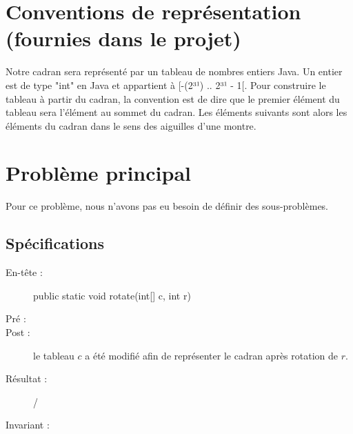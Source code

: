 	\section{Conventions de représentation (fournies dans le projet)}
	Notre cadran sera représenté par un tableau de nombres entiers Java. Un entier est de type "int" en Java et appartient à [-(2³¹) .. 2³¹ - 1[. Pour construire le tableau à partir du cadran, la convention est de dire que le premier élément du tableau sera l’élément au sommet du cadran. Les éléments suivants sont alors les éléments du cadran dans le sens des aiguilles d’une montre.
	\newpage
	\section{Problème principal}
	Pour ce problème, nous n’avons pas eu besoin de définir des sous-problèmes.
	
	\subsection{Spécifications}
		\begin{description}
			\item[En-tête :] public static void rotate(int[] c, int r)
			\item[Pré :] 
			\item [Post :] le tableau $c$ a été modifié afin de représenter le cadran après rotation de $r$.
			\item [Résultat :] /
		\end{description}

		\begin{description}
			\item[Invariant  :] 
		\end{description}

